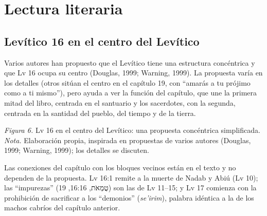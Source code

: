 \documentclass[11pt,letterpaper]{article}
\newcommand{\heb}[1]{\mbox{\foreignlanguage{hebrew}{#1}}}
\begin{document}
\section{Lectura literaria}

\subsection{Levítico 16 en el centro del Levítico}
Varios autores han propuesto que el Levítico tiene una estructura concéntrica y que Lv 16 ocupa su centro (Douglas, 1999; Warning, 1999). La propuesta varía en los detalles (otros sitúan el centro en el capítulo 19, con ``amarás a tu prójimo como a ti mismo''), pero ayuda a ver la función del capítulo, que une la primera mitad del libro, centrada en el santuario y los sacerdotes, con la segunda, centrada en la santidad del pueblo, del tiempo y de la tierra.

\begin{center}
\par
{\footnotesize\color{sepia}\textit{Figura 6.} Lv 16 en el centro del Levítico: una propuesta concéntrica simplificada. \textit{Nota.} Elaboración propia, inspirada en propuestas de varios autores (Douglas, 1999; Warning, 1999); los detalles se discuten.}
\end{center}

Las conexiones del capítulo con los bloques vecinos están en el texto y no dependen de la propuesta. Lv 16:1 remite a la muerte de Nadab y Abiú (Lv 10); las ``impurezas'' (\heb{טֻמְאֹת}, 16:16, 19) son las de Lv 11--15; y Lv 17 comienza con la prohibición de sacrificar a los ``demonios'' (\emph{se'irim}), palabra idéntica a la de los machos cabríos del capítulo anterior.
\end{document}
